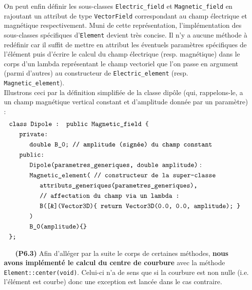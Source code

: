 \documentclass[12pt, letterpaper, twoside]{article}
\newcommand{\T}[1]{\texttt{#1}}
\begin{document}
\indent On peut enfin définir les sous-classes \T{Electric\_field} et \T{Magnetic\_field} en rajoutant un attribut de type \T{VectorField} correspondant au champ électrique et magnétique respectivement. Muni de cette représentation, l'implémentation des sous-classes spécifiques d'\T{Element} devient très concise. Il n'y a aucune méthode à redéfinir car il suffit de mettre en attribut les éventuels paramètres spécifiques de l'élément puis d'écrire le calcul du champ électrique (resp. magnétique) dans le corps d'un lambda représentant le champ vectoriel que l'on passe en argument (parmi d'autres) au constructeur de \T{Electric\_element} (resp. \T{Magnetic\_element}).\\ \indent Illustrons ceci par la définition simplifiée de la classe dipôle (qui, rappelons-le, a un champ magnétique vertical constant et d'amplitude donnée par un paramètre) :
\begin{align*}
	&\T{class Dipole : public Magnetic\_field \{}\\
	&\indent \T{private:}\\
	& \indent \indent \T{double B\_0; // amplitude (signée) du champ constant}\\
	&\indent \T{public:}\\
	& \indent \indent \T{Dipole(parametres\_generiques, double amplitude)} :\\
	& \indent \indent \T{Magnetic\_element( // constructeur de la super-classe}\\
	& \indent \indent \indent \T{attributs\_generiques(parametres\_generiques),}\\
	& \indent \indent \indent \T{// affectation du champ via un lambda :}\\
	& \indent \indent \indent \T{B([\&](Vector3D)\{ return Vector3D(0.0, 0.0, amplitude); \} }\\
	& \indent \indent \T{)}\\
	& \indent \indent \T{B\_0(amplitude)\{\}}\\
	& \T{\};}
\end{align*}

\ \linebreak
\ \linebreak
\textbf{(P6.3)} Afin d'alléger par la suite le corps de certaines méthodes, \textbf{nous avons implémenté le calcul du centre de courbure} avec la méthode \T{Element::center(void)}. Celui-ci n'a de sens que si la courbure est non nulle (i.e. l'élément est courbe) donc une exception est lancée dans le cas contraire.
\end{document}
